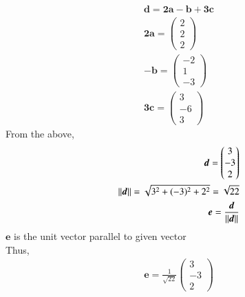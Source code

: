\begin{align}
    \bm{d}=\bm{2a}-\bm{b}+\bm{3c}\\
    \bm{2a}=\begin{pmatrix}2\\2\\2\end{pmatrix}\\
    \bm{-b}=\begin{pmatrix}-2\\1\\-3\end{pmatrix}\\
    \bm{3c}=\begin{pmatrix}3\\-6\\3\end{pmatrix}
\end{align}
From the above, 
\begin{align}
    \bm{d}=\begin{pmatrix}3\\-3\\2\end{pmatrix}\\
    \left\lVert\bm{d}\right\rVert=\sqrt{3^2+(-3)^2+2^2}=\sqrt{22}\\
    \bm{e}=\frac{\bm{d}}{\left\lVert\bm{d}\right\rVert}
\end{align}
$\bm{e}$  is the unit vector parallel to given vector\\
Thus,
\begin{align}
    \boxed{\bm{e}=\frac{1}{\sqrt{22}}\begin{pmatrix}3\\-3\\2\end{pmatrix}}
\end{align}
